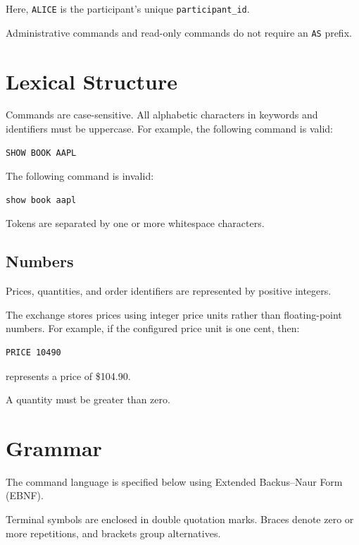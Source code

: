 \documentclass{article}
\begin{document}
Here, \texttt{ALICE} is the participant's unique
\texttt{participant\_id}.

Administrative commands and read-only commands do not require an
\texttt{AS} prefix.

\section{Lexical Structure}

Commands are case-sensitive. All alphabetic characters in keywords and
identifiers must be uppercase. For example, the following command is valid:

\begin{lstlisting}
SHOW BOOK AAPL
\end{lstlisting}

The following command is invalid:

\begin{lstlisting}
show book aapl
\end{lstlisting}

Tokens are separated by one or more whitespace characters.

\subsection{Numbers}

Prices, quantities, and order identifiers are represented by positive
integers.

The exchange stores prices using integer price units rather than
floating-point numbers. For example, if the configured price unit is one
cent, then:

\begin{lstlisting}
PRICE 10490
\end{lstlisting}

represents a price of \$104.90.

A quantity must be greater than zero.

\section{Grammar}

The command language is specified below using Extended Backus--Naur Form
(EBNF).

Terminal symbols are enclosed in double quotation marks. Braces denote
zero or more repetitions, and brackets group alternatives.
\end{document}
